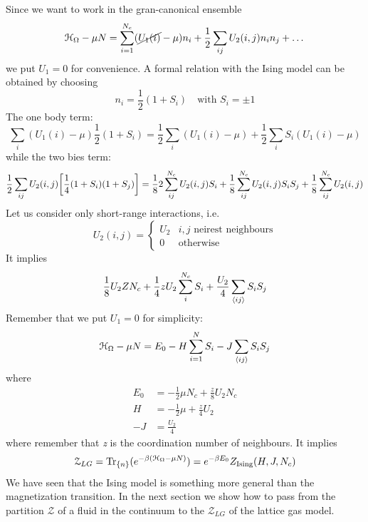 \documentclass[../main/main.tex]{subfiles}
\begin{document}
Since we want to work in the gran-canonical ensemble
\begin{equation}
  \mathcal{H}_ \Omega  - \mu N = \sum_{i=1}^{N_c} ( \cancel{ U_1 (i)} - \mu) n_i + \frac{1}{2} \sum_{ij}^{} U_2 (i,j) n_i n_j +   \dots
\end{equation}
we put \( U_1=0 \) for convenience. A formal relation with the Ising model can be obtained by choosing
\begin{equation}
  n_i = \frac{1}{2} (1+S_i) \quad \text{with } S_i = \pm 1
\end{equation}
The one body term:
\begin{equation}
  \sum_{i}^{} (U_1 (i) - \mu )  \frac{1}{2} (1+S_i) = \frac{1}{2} \sum_{i}^{} (U_1 (i) - \mu ) + \frac{1}{2} \sum_{i}^{} S_i (U_1 (i) - \mu )
\end{equation}
while the two bies term:
\begin{equation}
  \frac{1}{2} \sum_{ij}^{} U_2 (i,j) \qty[\frac{1}{4} (1+S_i)(1+S_j)] = \frac{1}{8} 2 \sum_{ij}^{N_c} U_2 (i,j) S_i + \frac{1}{8}  \sum_{ij}^{N_c} U_2 (i,j) S_i S_j + \frac{1}{8} \sum_{ij}^{N_c} U_2 (i,j)
\end{equation}
Let us consider only short-range interactions, i.e.
\begin{equation}
U_2 (i,j) =
  \begin{cases}
   U_2 & i,j \text{ neirest neighbours}\\
   0 & \text{otherwise}
  \end{cases}
\end{equation}
It implies
\begin{equation}
  \frac{1}{8} U_2 Z N_c + \frac{1}{4} z U_2 \sum_{i}^{N_c} S_i + \frac{U_2}{4} \sum_{\expval{ij} }^{} S_i S_j
\end{equation}
Remember that we put \( U_1 = 0 \) for simplicity:
\begin{equation}
    \mathcal{H}_ \Omega  - \mu N  =  E_0 - H \sum_{i=1}^{N} S_i - J \sum_{\expval{ij} }^{} S_i S_j
\end{equation}
where
\begin{subequations}
\begin{align}
     E_0 & = - \frac{1}{2} \mu N_c + \frac{z}{8} U_2 N_c \\
       H &= - \frac{1}{2} \mu + \frac{z}{4} U_2 \\
         -J & = \frac{U_2}{4}
\end{align}
\end{subequations}
where remember that \emph{z} is the coordination number of neighbours. It implies
\begin{equation}
  \mathcal{Z}_{LG} = \Tr_{\{n\}}(e^{-\beta (\mathcal{H}_ \Omega -\mu N)} ) = e^{-\beta E_0} Z_{\text{Ising}} (H,J,N_c)
\end{equation}
We have seen that the Ising model is something more general than the magnetization transition.
In the next section we show how to pass from the partition \( \mathcal{Z} \) of a fluid in the continuum to the  \( \mathcal{Z}_{LG} \) of the lattice gas model.
\end{document}
